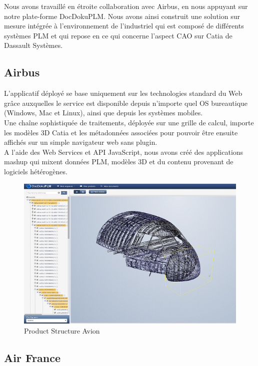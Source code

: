 \documentclass[11pt]{report}
\begin{document}
			\singlespacing

				Nous avons travaillé en étroite collaboration avec Airbus, en nous appuyant sur notre plate-forme DocDokuPLM. Nous avons ainsi construit une solution sur mesure intégrée à l'environnement de l'industriel qui est composé de différents systèmes PLM et qui repose en ce qui concerne l'aspect CAO sur Catia de Dassault Systèmes.

			\subsection{Airbus}
				L'applicatif déployé se base uniquement sur les technologies standard du Web grâce auxquelles le service est disponible depuis n'importe quel OS bureautique (Windows, Mac et Linux), ainsi que depuis les systèmes mobiles. \\
				Une chaîne sophistiquée de traitements, déployée sur une grille de calcul, importe les modèles 3D Catia et les métadonnées associées pour pouvoir être ensuite affichés sur un simple navigateur web sans plugin.\\
				A l'aide des Web Services et API JavaScript, nous avons créé des applications mashup qui mixent données PLM, modèles 3D et du contenu provenant de logiciels hétérogènes.

			\singlespacing

				\begin{figure}[!htb]
					\center
					\includegraphics{a1.png}
					\caption{Product Structure Avion}
				\end{figure}

			\subsection{Air France}
\end{document}
